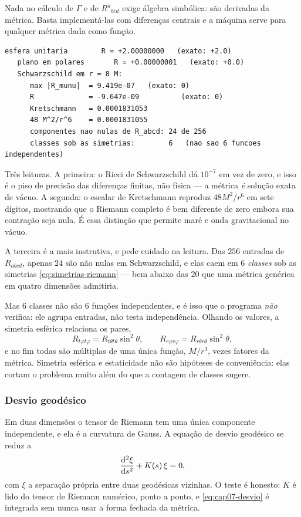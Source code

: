 Nada no cálculo de $\Gamma$ e de $R^a{}_{bcd}$ exige álgebra simbólica: são
derivadas da métrica. Basta implementá-las com diferenças centrais e a
máquina serve para qualquer métrica dada como função.

\begin{saida}
\begin{lstlisting}[style=rgsaida]
   esfera unitaria        R = +2.00000000   (exato: +2.0)
   plano em polares       R = +0.00000001   (exato: +0.0)
   Schwarzschild em r = 8 M:
      max |R_munu|  = 9.419e-07   (exato: 0)
      R             = -9.647e-09          (exato: 0)
      Kretschmann   = 0.0001831053
      48 M^2/r^6    = 0.0001831055
      componentes nao nulas de R_abcd: 24 de 256
      classes sob as simetrias:        6   (nao sao 6 funcoes independentes)
\end{lstlisting}
\end{saida}

Três leituras. A primeira: o Ricci de Schwarzschild dá $10^{-7}$ em vez de
zero, e isso é o piso de precisão das diferenças finitas, não física --- a
métrica \emph{é} solução exata de vácuo. A segunda: o escalar de Kretschmann
reproduz $48M^2/r^6$ em sete dígitos, mostrando que o Riemann completo é bem
diferente de zero embora sua contração seja nula. É essa distinção que
permite maré e onda gravitacional no vácuo.

A terceira é a mais instrutiva, e pede cuidado na leitura. Das $256$ entradas
de $R_{abcd}$, apenas $24$ são não nulas em Schwarzschild, e elas caem em $6$
\emph{classes} sob as simetrias \eqref{eq:simetrias-riemann} --- bem abaixo
das $20$ que uma métrica genérica em quatro dimensões admitiria.

Mas $6$ classes não são $6$ funções independentes, e é isso que o programa
\emph{não} verifica: ele agrupa entradas, não testa independência. Olhando os
valores, a simetria esférica relaciona os pares,
\[
  R_{t\varphi t\varphi}=R_{t\theta t\theta}\sin^2\theta ,
  \qquad
  R_{r\varphi r\varphi}=R_{r\theta r\theta}\sin^2\theta ,
\]
e no fim todas são múltiplas de uma única função, $M/r^3$, vezes fatores da
métrica. Simetria esférica e estaticidade não são hipóteses de conveniência:
elas cortam o problema muito além do que a contagem de classes sugere.

\subsubsection*{Desvio geodésico}

Em duas dimensões o tensor de Riemann tem uma única componente independente,
e ela é a curvatura de Gauss. A equação de desvio geodésico se reduz a
\begin{equation}
  \frac{\mathrm{d} ^2\xi}{\mathrm{d} s^2}+K(s)\,\xi=0,
  \label{eq:cap07-desvio}
\end{equation}
com $\xi$ a separação própria entre duas geodésicas vizinhas. O teste é
honesto: $K$ é lido do tensor de Riemann numérico, ponto a ponto, e
\eqref{eq:cap07-desvio} é integrada sem nunca usar a forma fechada da
métrica.


